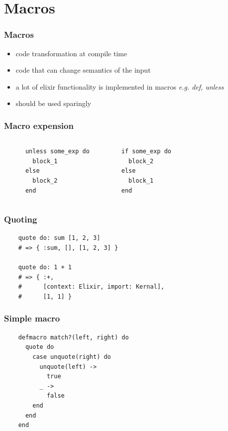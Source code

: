 \documentclass{beamer}
\begin{document}
\section[Section]{Macros}

\begin{frame}
  \frametitle{Macros}
  \begin{itemize}
  \item code transformation at compile time
  \item code that can change semantics of the input
  \item a lot of elixir functionality is implemented in macros \textsl{e.g. def, unless}
  \item should be used sparingly
  \end{itemize}
\end{frame}

\begin{frame}[fragile]
  \frametitle{Macro expension}
  \begin{columns}
    \begin{lstlisting}
      unless some_exp do
        block_1
      else
        block_2
      end
    \end{lstlisting}
    \begin{lstlisting}
      if some_exp do
        block_2
      else
        block_1
      end
    \end{lstlisting}
  \end{columns}
\end{frame}

\begin{frame}[fragile]
  \frametitle{Quoting}
  \begin{lstlisting}
    quote do: sum [1, 2, 3]
    # => { :sum, [], [1, 2, 3] }

    quote do: 1 + 1
    # => { :+,
    #      [context: Elixir, import: Kernal],
    #      [1, 1] }
  \end{lstlisting}
\end{frame}

\begin{frame}[fragile]
  \frametitle{Simple macro}
  \begin{lstlisting}
    defmacro match?(left, right) do
      quote do
        case unquote(right) do
          unquote(left) ->
            true
          _ ->
            false
        end
      end
    end
  \end{lstlisting}
\end{frame}
\end{document}
